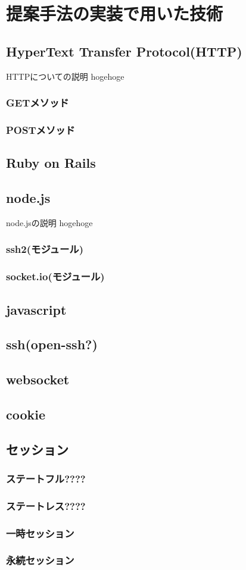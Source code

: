 \section{提案手法の実装で用いた技術}
    \subsection{HyperText Transfer Protocol(HTTP)}
        HTTPについての説明 hogehoge
        \subsubsection{GETメソッド}
        \subsubsection{POSTメソッド}
    \subsection{Ruby on Rails}
    \subsection{node.js}
        node.jsの説明 hogehoge
        \subsubsection{ssh2(モジュール)}%
        \subsubsection{socket.io(モジュール)}%
    \subsection{javascript}
    \subsection{ssh(open-ssh?)}
    \subsection{websocket}
    \subsection{cookie}
    \subsection{セッション}
        \subsubsection{ステートフル????}
        \subsubsection{ステートレス????}
        \subsubsection{一時セッション}%
        \subsubsection{永続セッション}%
